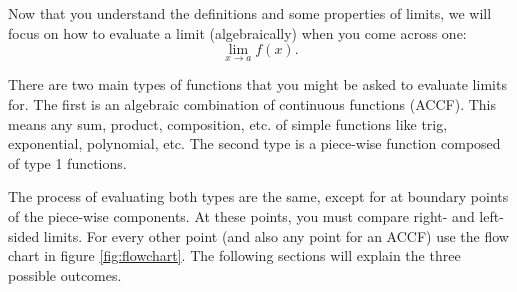 Now that you understand the definitions and some properties of limits, we will focus on how to evaluate a limit (algebraically) when you come across one:
$$\lim_{x\to a}f(x).$$

There are two main types of functions that you might be asked to evaluate limits for. The first is an algebraic combination of continuous functions (ACCF). This means any sum, product, composition, etc. of simple functions like trig, exponential, polynomial, etc. The second type is a piece-wise function composed of type 1 functions.


The process of evaluating both types are the same, except for at boundary points of the piece-wise components. At these points, you must compare right- and left-sided limits. For every other point (and also any point for an ACCF) use the flow chart in figure \ref{fig:flowchart}. The following sections will explain the three possible outcomes.

